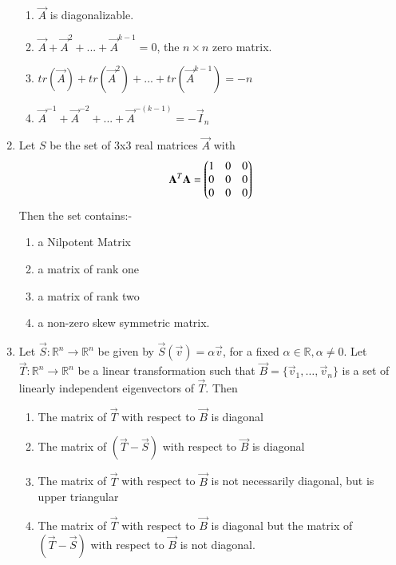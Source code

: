 \begin{enumerate}[label=\thesection.\arabic*.,ref=\thesection.\theenumi]
	\begin{enumerate}
		\item $\vec{A}$ is diagonalizable. \\
		\item $\vec{A}+\Vec{A}^2+...+\vec{A}^{k-1} = 0$, the $n\times n$ zero matrix. \\
		\item $tr(\vec{A})+tr(\Vec{A}^2)+...+tr(\vec{A}^{k-1}) = -n$ \\
		\item $\vec{A}^{-1}+\Vec{A}^{-2}+...+\vec{A}^{-(k-1)} = -\vec{I}_n$
	\end{enumerate}
%
%
\solution

\item Let $S$ be the set of 3x3 real matrices $\vec{A}$ with 
\begin{align}
    \mathbf{A}^T\mathbf{A}=\begin{pmatrix}1&0&0\\0&0&0\\0&0&0\end{pmatrix}
\end{align}
Then the set contains:-\\
\begin{enumerate}
    \item a Nilpotent Matrix
    \item a matrix of rank one
    \item a matrix of rank two
    \item a non-zero skew symmetric matrix.
\end{enumerate}
%
%
\solution

\item Let $\vec{S}: \mathbb R^n \rightarrow \mathbb R^n$ be given by $\vec{S}(\vec{v}) = \alpha\vec{v}$, for a fixed $\alpha \in \mathbb R, \alpha \neq 0$. Let $\vec{T}: \mathbb R^n \rightarrow \mathbb R^n$ be a linear transformation such that $\vec{B} = \{ \vec{v}_1,\ldots,\vec{v}_n \}$ is a set of linearly independent eigenvectors of $\vec{T}$. Then
\begin{enumerate}
    \item The matrix of $\vec{T}$ with respect to $\vec{B}$ is diagonal
    \item The matrix of $(\vec{T}-\vec{S})$ with respect to $\vec{B}$ is diagonal
    \item The matrix of $\vec{T}$ with respect to $\vec{B}$ is not necessarily diagonal, but is upper triangular
    \item The matrix of $\vec{T}$ with respect to $\vec{B}$ is diagonal but the matrix of $(\vec{T}-\vec{S})$ with respect to $\vec{B}$ is not diagonal.

\end{enumerate}
\end{enumerate}
